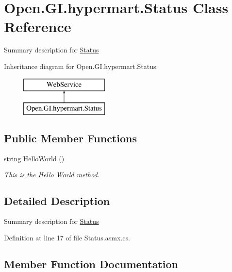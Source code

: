 \hypertarget{class_open_1_1_g_i_1_1hypermart_1_1_status}{}\section{Open.\+G\+I.\+hypermart.\+Status Class Reference}
\label{class_open_1_1_g_i_1_1hypermart_1_1_status}


Summary description for \hyperlink{class_open_1_1_g_i_1_1hypermart_1_1_status}{Status}  


Inheritance diagram for Open.\+G\+I.\+hypermart.\+Status\+:\begin{figure}[H]
\begin{center}
\leavevmode
\includegraphics[height=2.000000cm]{class_open_1_1_g_i_1_1hypermart_1_1_status}
\end{center}
\end{figure}
\subsection*{Public Member Functions}
\begin{DoxyCompactItemize}
\item 
string \hyperlink{class_open_1_1_g_i_1_1hypermart_1_1_status_a73a11d6869226091bd66017995dfabef}{Hello\+World} ()
\begin{DoxyCompactList}\small\item\em This is the Hello World method. \end{DoxyCompactList}\end{DoxyCompactItemize}


\subsection{Detailed Description}
Summary description for \hyperlink{class_open_1_1_g_i_1_1hypermart_1_1_status}{Status} 



Definition at line 17 of file Status.\+asmx.\+cs.



\subsection{Member Function Documentation}
\hypertarget{class_open_1_1_g_i_1_1hypermart_1_1_status_a73a11d6869226091bd66017995dfabef}{}
